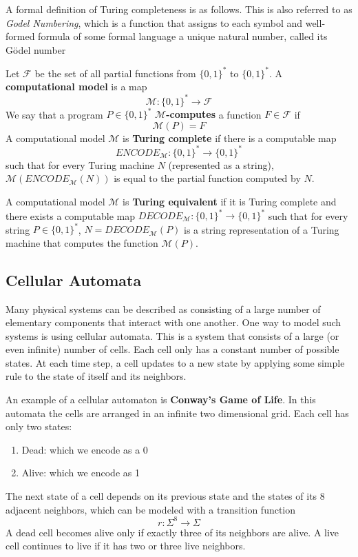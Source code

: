 \documentclass{article}
\begin{document}
  A formal definition of Turing completeness is as follows. This is also referred to as \textit{Godel Numbering}, which is a function that assigns to each symbol and well-formed formula of some formal language a unique natural number, called its Gödel number 

  \begin{definition}
  Let $\mathcal{F}$ be the set of all partial functions from $\{0, 1\}^*$ to $\{0,1\}^*$. A \textbf{computational model} is a map
  \[\mathcal{M}: \{0,1\}^* \longrightarrow \mathcal{F}\]
  We say that a program $P \in \{0,1\}^*$ \textbf{$\mathcal{M}$-computes} a function $F \in \mathcal{F}$ if 
  \[\mathcal{M}(P) = F\]
  A computational model $\mathcal{M}$ is \textbf{Turing complete} if there is a computable map 
  \[ENCODE_{\mathcal{M}} : \{0,1\}^* \longrightarrow \{0,1\}^*\]
  such that for every Turing machine $N$ (represented as a string), $\mathcal{M}(ENCODE_\mathcal{M} (N))$ is equal to the partial function computed by $N$. 

  A computational model $\mathcal{M}$ is \textbf{Turing equivalent} if it is Turing complete and there exists a computable map $DECODE_\mathcal{M}: \{0,1\}^* \longrightarrow \{0,1\}^*$ such that for every string $P \in \{0,1\}^*$, $N = DECODE_\mathcal{M} (P)$ is a string representation of a Turing machine that computes the function $\mathcal{M}(P)$. 
  \end{definition} 

  \subsection{Cellular Automata}
  Many physical systems can be described as consisting of a large number of elementary components that interact with one another. One way to model such systems is using cellular automata. This is a system that consists of a large (or even infinite) number of cells. Each cell only has a constant number of possible states. At each time step, a cell updates to a new state by applying some simple rule to the state of itself and its neighbors.

  \begin{definition}
  An example of a cellular automaton is \textbf{Conway's Game of Life}. In this automata the cells are arranged in an infinite two dimensional grid. Each cell has only two states: 
  \begin{enumerate}
      \item Dead: which we encode as a 0
      \item Alive: which we encode as 1
  \end{enumerate}
  The next state of a cell depends on its previous state and the states of its 8 adjacent neighbors, which can be modeled with a transition function
  \[r: \Sigma^8 \longrightarrow \Sigma\]
  A dead cell becomes alive only if exactly three of its neighbors are alive. A live cell continues to live if it has two or three live neighbors. 
  \end{definition}
\end{document}
